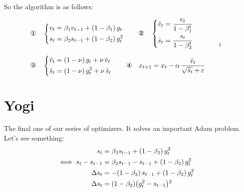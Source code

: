 So the algorithm is as follows:
\begin{keyformula}
\[
\begin{aligned}
&\text{\ding{172}}\quad\left\{\begin{aligned}v_t&=\beta_1 v_{t-1}+(1-\beta_1)\,g_t\\ s_t&=\beta_2 s_{t-1}+(1-\beta_2)\,g_t^2\end{aligned}\right.
\qquad
\text{\ding{173}}\quad\left\{\begin{aligned}\hat v_t&=\frac{v_t}{1-\beta_1^t}\\ \hat s_t&=\frac{s_t}{1-\beta_2^t}\end{aligned}\right.\\[6pt]
&\text{\ding{174}}\quad\left\{\begin{aligned}\tilde v_t&=(1-\nu)\,g_t+\nu\,\hat v_t\\ \tilde s_t&=(1-\nu)\,g_t^2+\nu\,\hat s_t\end{aligned}\right.
\qquad
\text{\ding{175}}\quad x_{t+1}=x_t-\alpha\,\frac{\tilde v_t}{\sqrt{\tilde s_t}+\varepsilon}
\end{aligned}
\qquad\text{\ednotemark}\]
\end{keyformula}

\section{Yogi}

\Prob
The final one of our series of optimizers. It solves an important Adam problem. Let's see something:
\begin{align*}
s_t&=\beta_2 s_{t-1}+(1-\beta_2)\,g_t^2\\
\iff s_t-s_{t-1}&=\beta_2 s_{t-1}-s_{t-1}+(1-\beta_2)\,g_t^2\\
\Delta s_t&=-(1-\beta_2)\,s_{t-1}+(1-\beta_2)\,g_t^2\\
\Delta s_t&=(1-\beta_2)\bigl(g_t^2-s_{t-1}\bigr)\text{\ednotemark}
\end{align*}

